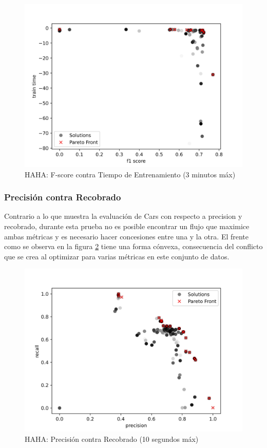 \begin{figure}[ht]
    \centering
    \includegraphics[scale=0.65]{Pictures/haha_fscore_vs_time_3min.jpg}
    \caption{HAHA: F-score contra Tiempo de Entrenamiento (3 minutos m\'ax)}
    \label{impl:fig:haha:fscore_vs_time}
\end{figure}

\subsubsection{Precisi\'on contra Recobrado}
Contrario a lo que muestra la evaluaci\'on de Cars con respecto a precision y recobrado, durante esta prueba no es posible encontrar un flujo que maximice ambas m\'etricas y es necesario hacer concesiones entre una y la otra. El frente como se observa en la figura \ref{impl:fig:HAHA:precision_vs_recall} tiene una forma c\'onvexa, consecuencia del conflicto que se crea al optimizar para varias m\'etricas en este conjunto de datos.

\begin{figure}[ht]
    \centering
    \includegraphics[scale=0.65]{Pictures/haha_precision_vs_recall.jpg}
    \caption{HAHA: Precisi\'on contra Recobrado (10 segundos m\'ax)}
    \label{impl:fig:HAHA:precision_vs_recall}
\end{figure}

